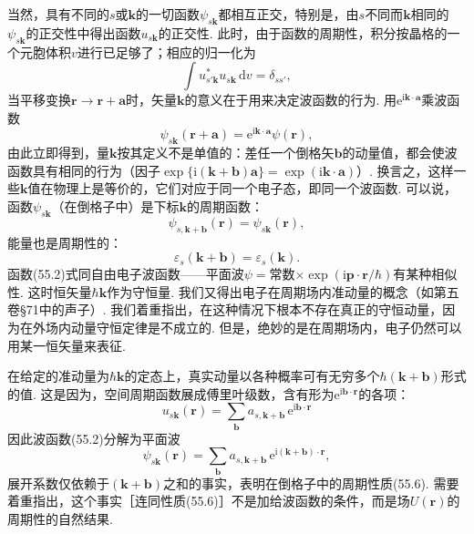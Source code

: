 当然，具有不同的$s$或$\bm k$的一切函数$\psi_{s\bm k}$都相互正交，特别是，由$s$不同而$\bm k$相同的$\psi_{s\bm k}$的正交性中得出函数$u_{s\bm k}$的正交性. 此时，由于函数的周期性，积分按晶格的一个元胞体积$v$进行已足够了；相应的归一化为
\begin{equation}
\int u^{*}_{s'\bm k}u_{s\bm k}\,\mathrm d v=\delta_{ss'},
\label{55.4}
\end{equation}
当平移变换$\bm r\to\bm r+\bm a$时，矢量$\bm k$的意义在于用来决定波函数的行为. 用$\mathrm e^{\mathrm i\bm k\cdot\bm a}$乘波函数
\begin{equation}
\psi_{s\bm k}(\bm r+\bm a)=\mathrm e^{\mathrm i\bm k\cdot\bm a}\psi(\bm r),
\label{55.5}
\end{equation}
由此立即得到，量$\bm k$按其定义不是单值的：差任一个倒格矢$\bm b$的动量值，都会使波函数具有相同的行为（因子$\exp\{\mathrm i(\bm k+\bm b)\bm a\}=\exp(\mathrm i\bm k\cdot\bm a)$）. 换言之，这样一些$\bm k$值在物理上是等价的，它们对应于同一个电子态，即同一个波函数. 可以说，函数$\psi_{s\bm k}$（在倒格子中）是下标$\bm k$的周期函数：
\begin{equation}
\psi_{s,\bm k+\bm b}(\bm r)=\psi_{s\bm k}(\bm r),
\label{55.6}
\end{equation}
能量也是周期性的：
\begin{equation}
\varepsilon_s(\bm k+\bm b)=\varepsilon_s(\bm k).
\label{55.7}
\end{equation}
函数(55.2)式同自由电子波函数——平面波$\psi=$常数$\times\exp(\mathrm i\bm p\cdot\bm r/\hbar)$有某种相似性. 这时恒矢量$\hbar\bm k$作为守恒量. 我们又得出电子在周期场内准动量的概念（如第五卷§71中的声子）. 我们着重指出，在这种情况下根本不存在真正的守恒动量，因为在外场内动量守恒定律是不成立的. 但是，绝妙的是在周期场内，电子仍然可以用某一恒矢量来表征.

在给定的准动量为$\hbar\bm k$的定态上，真实动量以各种概率可有无穷多个$\hbar(\bm k+\bm b)$形式的值. 这是因为，空间周期函数展成傅里叶级数，含有形为$\mathrm e^{\mathrm i\bm b\cdot\bm r}$的各项：
\begin{equation*}
u_{s\bm k}(\bm r)=\sum_{\bm b}a_{s,\bm k+\bm b}\,\mathrm e^{\mathrm i\bm b\cdot\bm r}
\end{equation*}
因此波函数(55.2)分解为平面波
\begin{equation}
\psi_{s\bm k}(\bm r)=\sum_{\bm b}a_{s,\bm k+\bm b}\,\mathrm e^{\mathrm i(\bm k+\bm b)\cdot\bm r},
\label{55.8}
\end{equation}
展开系数仅依赖于$(\bm k+\bm b)$之和的事实，表明在倒格子中的周期性质(55.6). 需要着重指出，这个事实［连同性质(55.6)］不是加给波函数的条件，而是场$U(\bm r)$的周期性的自然结果.

